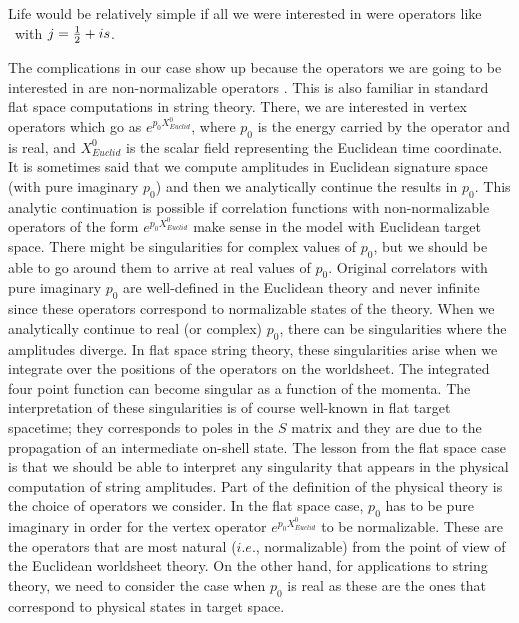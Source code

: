 Life would be relatively simple if all we were interested in
were operators like \operators\ with
$j = {1 \over 2} + is$.

The complications in our case show up because the operators we
are going to be interested in are non-normalizable operators
.
This is also familiar in  standard flat space computations
in string theory. There, we are interested
in vertex operators which go as $e^{p_0 X_{Euclid}^0}$,
where $p_0$ is the energy carried by the operator and is
real, and $X_{Euclid}^0$ is the scalar field representing
the Euclidean time coordinate.
It is sometimes said that we compute amplitudes in Euclidean signature
space (with pure imaginary $p_0$) and
then we analytically continue the results
in $p_0$. This analytic continuation is possible
if  correlation functions with non-normalizable operators
of the form $ e^{p_0 X_{Euclid}^0}$ make sense in the
model with Euclidean target space. There might be singularities
for complex values of $p_0$, but we should be able to go around them
to arrive at real values of $p_0$.
Original correlators with pure imaginary $p_0$ are well-defined
in the Euclidean theory and never infinite since these operators
correspond to normalizable states of the theory.
When we analytically continue to real (or complex) $p_0$, there
can be singularities  where the amplitudes diverge.
In flat space string theory,
these singularities arise when we integrate
over the positions of the operators on the worldsheet.
The integrated four point function
can become singular as a function of the momenta.
 The interpretation of these singularities is
of course well-known in  flat target spacetime; they
corresponds to poles in the $S$ matrix and
they are due to the propagation of an intermediate on-shell state.
 The lesson from the flat space case
is that we should be able to interpret
any singularity that appears in the physical computation
of string amplitudes.
Part of the definition of the physical theory is the choice of operators
we consider. In the flat space case, $p_0$ has to be
pure imaginary in order for the vertex operator $e^{p_0 X^0_{Euclid}}$
to be normalizable. These are the operators  that are most natural
($i.e.$, normalizable)
from the point of view of the Euclidean worldsheet theory.
On the other hand, for applications to
string theory, we need to consider the case when
$p_0$ is real as these are the ones that correspond to
physical states in target space.

